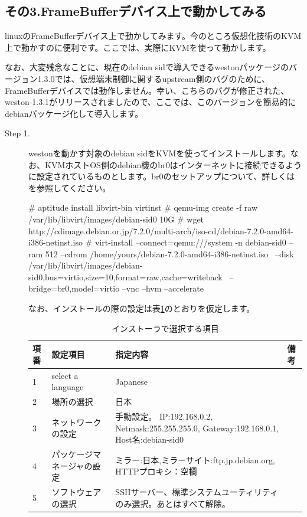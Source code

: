 \documentclass[mingoth,a4paper]{jsarticle}
\begin{document}
\subsection{その3.FrameBufferデバイス上で動かしてみる}

 linuxのFrameBufferデバイス上で動かしてみます。今のところ仮想化技術のKVM上で動かすのに便利です。ここでは、実際にKVMを使って動かします。

 なお、大変残念なことに、現在のdebian sidで導入できるwestonパッケージのバージョン1.3.0では、仮想端末制御に関するupstream側のバグのために、FrameBufferデバイスでは動作しません。幸い、こちらのバグが修正された、weston-1.3.1がリリースされましたので、ここでは、このバージョンを簡易的にdebianパッケージ化して導入します。

\begin{description}
\item [Step 1.]  westonを動かす対象のdebian sidをKVMを使ってインストールします。なお、KVMホストOS側のdebian機のbr0はインターネットに接続できるように設定されているものとします。br0のセットアップについて、詳しくは\cite{kde-devel-debian}を参照してください。
\begin{commandline}
# aptitude install libvirt-bin virtinst
# qemu-img create -f raw /var/lib/libvirt/images/debian-sid0 10G
# wget http://cdimage.debian.or.jp/7.2.0/multi-arch/iso-cd/debian-7.2.0-amd64-i386-netinst.iso
# virt-install --connect=qemu:///system -n debian-sid0 --ram 512  --cdrom /home/yours/debian-7.2.0-amd64-i386-netinst.iso \
  --disk /var/lib/libvirt/images/debian-sid0,bus=virtio,size=10,format=raw,cache=writeback \
  --bridge=br0,model=virtio --vnc --hvm --accelerate
\end{commandline}

 なお、インストールの際の設定は表\ref{tab:inst-settings}のとおりを仮定します。

\begin{table}[ht]
\begin{center}
\begin{tabular}{|l|p{5cm}|p{7cm}|l|}
\hline
項番&設定項目&指定内容&備考\\
\hline \hline
1&select a language& Japanese& \\
2&場所の選択&日本&\\
3&ネットワークの設定&手動設定。 IP:192.168.0.2, Netmask:255.255.255.0, Gateway:192.168.0.1, Host名:debian-sid0& \\
4&パッケージマネージャの設定&ミラー:日本,ミラーサイト:ftp.jp.debian.org, HTTPプロキシ：空欄&\\
5&ソフトウェアの選択&SSHサーバー、標準システムユーティリティのみ選択。あとはすべて解除。& \\
\hline
\end{tabular}
\caption{\label{tab:inst-settings}インストーラで選択する項目}
\end{center}
\end{table}


\end{description}
\end{document}
